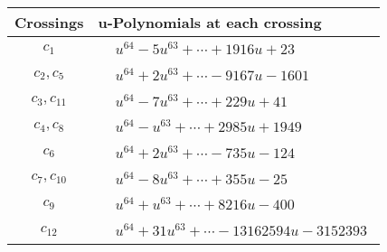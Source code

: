 \documentclass[1p]{elsarticle_modified}
\theoremstyle{definition}
\begin{document}
\begin{tabular}{m{50pt}|m{274pt}}
Crossings & \hspace{64pt}u-Polynomials at each crossing \\
\hline $$\begin{aligned}c_{1}\end{aligned}$$&$\begin{aligned}
&u^{64}-5 u^{63}+\cdots+1916 u+23
\end{aligned}$\\
\hline $$\begin{aligned}c_{2},c_{5}\end{aligned}$$&$\begin{aligned}
&u^{64}+2 u^{63}+\cdots-9167 u-1601
\end{aligned}$\\
\hline $$\begin{aligned}c_{3},c_{11}\end{aligned}$$&$\begin{aligned}
&u^{64}-7 u^{63}+\cdots+229 u+41
\end{aligned}$\\
\hline $$\begin{aligned}c_{4},c_{8}\end{aligned}$$&$\begin{aligned}
&u^{64}- u^{63}+\cdots+2985 u+1949
\end{aligned}$\\
\hline $$\begin{aligned}c_{6}\end{aligned}$$&$\begin{aligned}
&u^{64}+2 u^{63}+\cdots-735 u-124
\end{aligned}$\\
\hline $$\begin{aligned}c_{7},c_{10}\end{aligned}$$&$\begin{aligned}
&u^{64}-8 u^{63}+\cdots+355 u-25
\end{aligned}$\\
\hline $$\begin{aligned}c_{9}\end{aligned}$$&$\begin{aligned}
&u^{64}+u^{63}+\cdots+8216 u-400
\end{aligned}$\\
\hline $$\begin{aligned}c_{12}\end{aligned}$$&$\begin{aligned}
&u^{64}+31 u^{63}+\cdots-13162594 u-3152393
\end{aligned}$\\
\hline
\end{tabular}\\~\\
\end{document}

